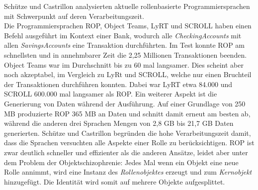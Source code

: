 \documentclass[conference]{IEEEtran}
\begin{document}
Schütze und Castrillon analysierten aktuelle rollenbasierte Programmiersprachen mit Schwerpunkt auf deren Verarbeitungszeit\cite{schutze2017analyzing}.\\ Die Programmiersprachen ROP, Object Teams, LyRT und SCROLL haben einen Befehl ausgeführt im Kontext einer Bank, wodurch alle \textit{CheckingAccounts} mit allen \textit{SavingsAccounts} eine Transaktion durchführten. Im Test konnte ROP am schnellsten und in annehmbarer Zeit die 2,25 Millionen Transaktionen beenden. Object Teams war im Durchschnitt bis zu 60 mal langsamer. Dies scheint aber noch akzeptabel, im Vergleich zu LyRt und SCROLL, welche nur einen Bruchteil der Transaktionen durchführen konnten. Dabei war LyRT etwa 84.000 und SCROLL 600.000 mal langsamer als ROP. Ein weiterer Aspekt ist die Generierung von Daten während der Ausführung. Auf einer Grundlage von 250 MB produzierte ROP 365 MB an Daten und schnitt damit erneut am besten ab, während die anderen drei Sprachen Mengen von 2,8 GB bis 21,7 GB Daten generierten. Schütze und Castrillon begründen die hohe Verarbeitungszeit damit, dass die Sprachen versuchten alle Aspekte einer Rolle zu berücksichtigen. ROP ist zwar deutlich schneller und effizienter als die anderen Ansätze, leidet aber unter dem Problem der Objektschizophrenie: Jedes Mal wenn ein Objekt eine neue Rolle annimmt, wird eine Instanz des \textit{Rollenobjektes} erzeugt und zum \textit{Kernobjekt} hinzugefügt. Die Identität wird somit auf mehrere Objekte aufgesplittet. 
\end{document}
